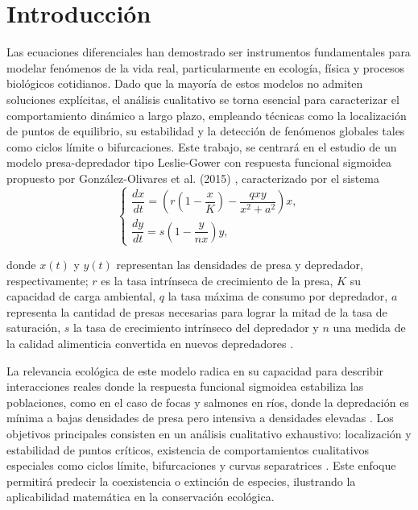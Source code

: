 \chapter*{Introducción}
Las ecuaciones diferenciales han demostrado ser instrumentos fundamentales para modelar fenómenos de la vida real, particularmente en ecología, física y procesos biológicos cotidianos. Dado que la mayoría de estos modelos no admiten soluciones explícitas, el análisis cualitativo se torna esencial para caracterizar el comportamiento dinámico a largo plazo, empleando técnicas como la localización de puntos de equilibrio, su estabilidad y la detección de fenómenos globales tales como ciclos límite o bifurcaciones. Este trabajo, se centrará en el estudio de un modelo presa-depredador tipo Leslie-Gower con respuesta funcional sigmoidea propuesto por González-Olivares et al. (2015) \cite{articulo}, caracterizado por el sistema
\begin{equation*}
	\begin{cases} 
		\dfrac{dx}{dt} = (r \left(1 - \dfrac{x}{K}\right) - \dfrac{q x y}{x^2 + a^2})x, \\[5pt]
		\dfrac{dy}{dt} = s \left(1 - \dfrac{y}{n x}\right) y,
	\end{cases}
\end{equation*}

donde $x(t)$ y $y(t)$ representan las densidades de presa y depredador, respectivamente; $r$ es la tasa intrínseca de crecimiento de la presa, $K$ su capacidad de carga ambiental, $q$ la tasa máxima de consumo por depredador, $a$ representa la cantidad de presas necesarias para lograr la mitad de la tasa de saturación, $s$ la tasa de crecimiento intrínseco del depredador y $n$ una medida de la calidad alimenticia convertida en nuevos depredadores \cite[p. 1895]{articulo}.
	
La relevancia ecológica de este modelo radica en su capacidad para describir interacciones reales donde la respuesta funcional sigmoidea estabiliza las poblaciones, como en el caso de focas y salmones en ríos, donde la depredación es mínima a bajas densidades de presa pero intensiva a densidades elevadas \cite[p. 1896]{articulo}. Los objetivos principales consisten en un análisis cualitativo exhaustivo: localización y estabilidad de puntos críticos, existencia de comportamientos cualitativos especiales como ciclos límite, bifurcaciones y curvas separatrices \cite{articulo}. Este enfoque permitirá predecir la coexistencia o extinción de especies, ilustrando la aplicabilidad matemática en la conservación ecológica.
	
